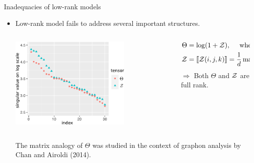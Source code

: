 \documentclass[10pt, mathserif]{beamer} %
\theoremstyle{definition}
\theoremstyle{plain}
\begin{document}
\begin{frame}{Inadequacies of  low-rank models}
\begin{itemize}
 \item Low-rank model fails to address several important structures.
 \begin{columns}
\begin{column}{0.55\textwidth}
   \begin{center}
     \includegraphics[width=0.7\textwidth]{Figures/example2.pdf}
     \end{center}
\end{column}
\begin{column}{0.6\textwidth}  
\begin{align}\Theta &= \log(1+\mathcal{Z}),\quad\text{ where }\\
\mathcal{Z}&=\llbracket \mathcal{Z}(i,j,k) \rrbracket  = \frac{1}{d}\max(i,j,k). \text{ }\hspace{1cm} 
\end{align}
$\Rightarrow$ Both $\Theta$ and $\mathcal{Z}$ are full rank. 
\end{column}
\end{columns}
    
{\tiny \hfill The matrix analogy of $\Theta$ was studied in the context of graphon analysis by Chan and Airoldi (2014).}
 \end{itemize}
\end{frame}
\end{document}
